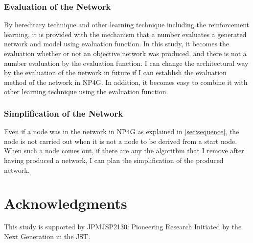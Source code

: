 \documentclass{article}
\begin{document}
\subsubsection {Evaluation of the Network}
By hereditary technique and other learning technique including the reinforcement learning, it is provided with the mechanism that a number evaluates a generated network and model using evaluation function.
In this study, it becomes the evaluation whether or not an objective network was produced, and there is not a number evaluation by the evaluation function.
I can change the architectural way by the evaluation of the network in future if I can establish the evaluation method of the network in NP4G.
In addition, it becomes easy to combine it with other learning technique using the evaluation function.
\subsubsection {Simplification of the Network}
Even if a node was in the network in NP4G as explained in \ref{sec:sequence}, the node is not carried out when it is not a node to be derived from a start node.
When such a node comes out, if there are any the algorithm that I remove after having produced a network, I can plan the simplification of the produced network.
\section*{Acknowledgments}
This study is supported by JPMJSP2130: Pioneering Research Initiated by the Next Generation in the JST.


  
  
\end{document}

